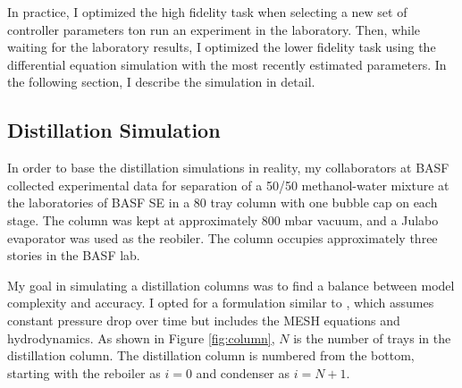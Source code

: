 
In practice, I optimized the high fidelity task when selecting  a new set of controller parameters ton run an experiment in the laboratory. Then, while waiting for the laboratory results, I optimized the lower fidelity task using the differential equation simulation with the most recently estimated parameters.  In the following section, I describe the simulation in detail.

\subsection{Distillation Simulation}\label{sec:distillation_model}

In order to base the distillation simulations in reality, my collaborators at BASF collected experimental data for separation of a 50/50 methanol-water mixture at the laboratories of BASF SE in a 80 tray column with one bubble cap on each stage. The column was kept at approximately 800 mbar vacuum, and a Julabo evaporator was used as the reobiler. The column occupies approximately three stories in the BASF lab.  


My goal in simulating a distillation columns was to find a balance between model complexity and accuracy. I opted for a formulation similar to \citet{Diehl2001}, which assumes constant pressure drop over time but includes the MESH equations and hydrodynamics. As shown in Figure \ref{fig:column}, $N$ is the number of trays in the distillation column. The distillation column is numbered from the bottom, starting with the reboiler as $i=0$ and condenser as $i=N+1$.  

